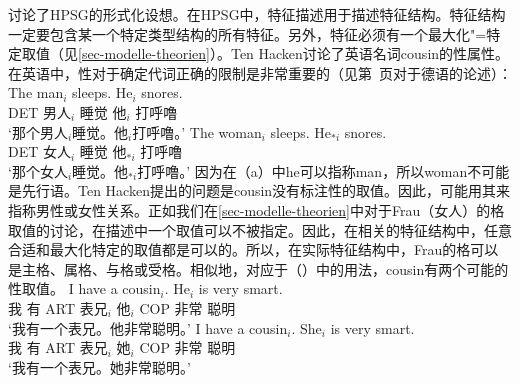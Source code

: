 \mbox{}讨论了HPSG\indexhpsgc 的形式化设想。在HPSG中，特征描述用于描述特征结构。特征结构一定要包含某一个特定类型结构的所有特征。另外，特征必须有一个最大化"=特定取值（见\ref{sec-modelle-theorien}）。Ten Hacken讨论了英语名词cousin的性属性。在英语中，性对于确定代词正确的限制是非常重要的（见第~\pageref{le-buch}页对于德语的论述）：
\eal
\ex 
\gll The man$_i$ sleeps. He$_i$ snores.\\
	 DET 男人$_i$ 睡觉 他$_i$  打呼噜\\
\glt `那个男人$_i$睡觉。他$_i$打呼噜。'
\ex 
\gll The woman$_i$ sleeps. He$_{*i}$ snores.\\
	 DET 女人$_i$ 睡觉 他$_{*i}$  打呼噜\\
\glt `那个女人$_i$睡觉。他$_{*i}$打呼噜。'
\zl
因为在（a）中he可以指称man，所以woman不可能是先行语。Ten Hacken提出的问题是cousin没有标注性的取值。因此，可能用其来指称男性或女性关系。正如我们在\ref{sec-modelle-theorien}中对于Frau（女人）的格取值的讨论，在描述中一个取值可以不被指定。因此，在相关的特征结构中，任意合适和最大化特定的取值都是可以的。所以，在实际特征结构中，Frau的格可以是主格、属格、与格或受格。相似地，对应于（）中的用法，cousin有两个可能的性取值。
\eal
\ex 
\gll I have a cousin$_i$. He$_i$ is very smart.\\
	 我 有 ART 表兄$_i$ 他$_i$ COP 非常 聪明\\
\glt `我有一个表兄。他非常聪明。'
\ex 
\gll I have a cousin$_i$. She$_i$ is very smart.\\
	 我 有 ART 表兄$_i$ 她$_i$ COP 非常 聪明\\
\glt `我有一个表兄。她非常聪明。'
\zl

